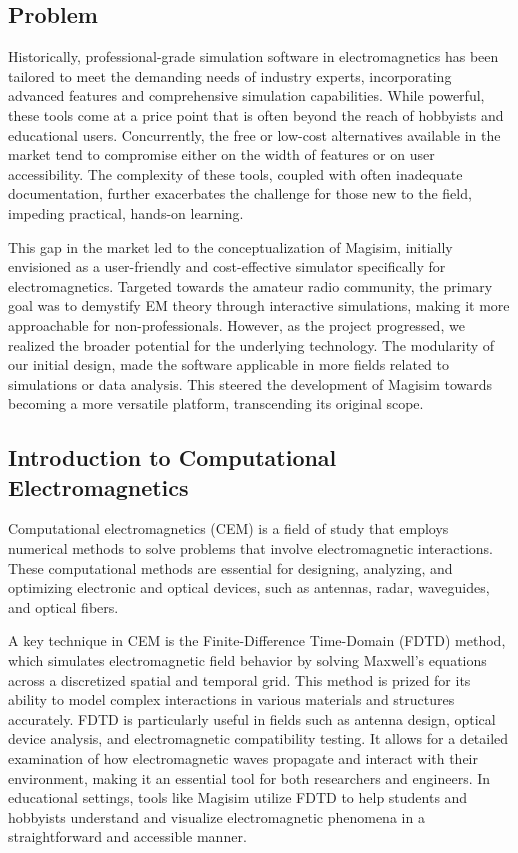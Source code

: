 \documentclass[11pt, a4paper, titlepage]{article}
\begin{document}
\subsection{Problem}
Historically, professional-grade simulation software in electromagnetics has been tailored to meet the demanding needs of industry experts, incorporating advanced features and comprehensive simulation capabilities. While powerful, these tools come at a price point that is often beyond the reach of hobbyists and educational users. Concurrently, the free or low-cost alternatives available in the market tend to compromise either on the width of features or on user accessibility. The complexity of these tools, coupled with often inadequate documentation, further exacerbates the challenge for those new to the field, impeding practical, hands-on learning.

This gap in the market led to the conceptualization of Magisim, initially envisioned as a user-friendly and cost-effective simulator specifically for electromagnetics. Targeted towards the amateur radio community, the primary goal was to demystify EM theory through interactive simulations, making it more approachable for non-professionals. However, as the project progressed, we realized the broader potential for the underlying technology. The modularity of our initial design, made the software applicable in more fields related to simulations or data analysis. This steered the development of Magisim towards becoming a more versatile platform, transcending its original scope.
\newpage

\subsection{Introduction to Computational Electromagnetics}
Computational electromagnetics (CEM) is a field of study that employs numerical methods to solve problems that involve electromagnetic interactions. These computational methods are essential for designing, analyzing, and optimizing electronic and optical devices, such as antennas, radar, waveguides, and optical fibers.

A key technique in CEM is the Finite-Difference Time-Domain (FDTD) method, which simulates electromagnetic field behavior by solving Maxwell's equations across a discretized spatial and temporal grid. This method is prized for its ability to model complex interactions in various materials and structures accurately. FDTD is particularly useful in fields such as antenna design, optical device analysis, and electromagnetic compatibility testing. It allows for a detailed examination of how electromagnetic waves propagate and interact with their environment, making it an essential tool for both researchers and engineers. In educational settings, tools like Magisim utilize FDTD to help students and hobbyists understand and visualize electromagnetic phenomena in a straightforward and accessible manner.
\end{document}
